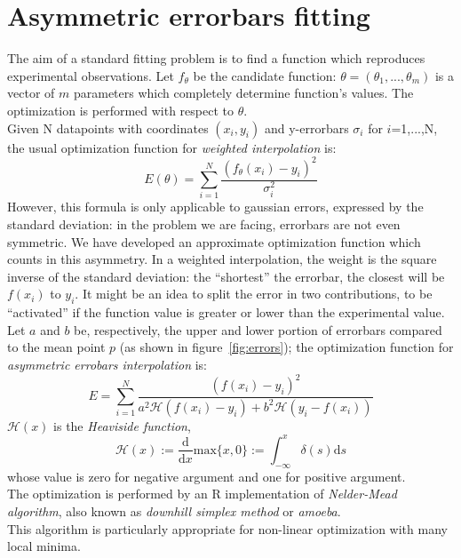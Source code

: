 \section{Asymmetric errorbars fitting}\label{Appendix B}
The aim of a standard fitting problem is to find a function which
reproduces experimental observations.
Let $f_{\theta}$ be the candidate function:
$\theta=(\theta_1,...,\theta_m)$ is a vector of $m$ parameters which
completely determine function's values.
The optimization is performed with respect to $\theta$.\\
Given N datapoints with coordinates ${(x_i,y_i)}$ and y-errorbars
$\sigma_i$ for $i$=1,...,N, the usual optimization function for
\textit{weighted interpolation}\cite{interpolation} is:
$$
E(\theta)= \sum_{i=1}^{N} \frac{(f_{\theta}(x_i)-y_i)^2}{\sigma_{i}^2}
$$
However, this formula is only applicable to gaussian errors,
expressed by the standard deviation: in the problem we are facing,
errorbars are not even symmetric.
We have developed an approximate optimization function which counts
in this asymmetry.
In a weighted interpolation, the weight is the square inverse of the
standard deviation: the ``shortest'' the errorbar, the closest will
be $f(x_i)$ to $y_i$.
It might be an idea to split the error in two contributions,
to be ``activated'' if the function value is greater or lower
than the experimental value.
Let $a$ and $b$ be, respectively, the upper and lower portion of errorbars
compared to the mean point $p$ (as shown in figure~\ref{fig:errors});
the optimization function for \textit{asymmetric
  errobars interpolation} is:
$$ E= \sum_{i=1}^{N} \frac{(f(x_i)-y_i)^2}{a^{2}\mathcal{H}(f(x_i)-y_i)+b^{2}\mathcal{H}(y_i-f(x_i))} $$
$\mathcal{H}(x)$ is the \textit{Heaviside function},
$$\mathcal{H}(x):=\frac{\mathrm{d}}{\mathrm{d}x}\mathrm{max}
\{x,0\}:=\int_{-\infty}^x \delta (s) \mathrm{d}s$$ whose value
is zero for negative argument and one for positive argument.\\
The optimization is performed by an R implementation\cite{Roptim}
of \textit{Nelder-Mead algorithm},\cite{neldermeadoriginal}
also known as \textit{downhill simplex method} or
\textit{amoeba}.\cite{neldermeadnumrec}\\
This algorithm is particularly appropriate for non-linear
optimization with many local minima.

